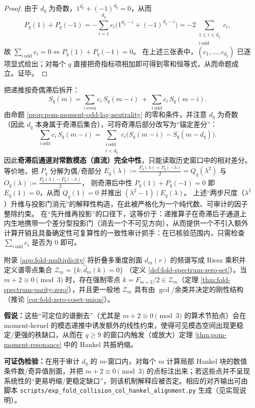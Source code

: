 \begin{proof}
由于 \(d_q\) 为奇数，\(1^{d_q}+(-1)^{d_q}=0\)，从而
\[
P_q(1)+P_q(-1)
= -\sum_{i=1}^{d_q} c_i\bigl(1^{d_q-i}+(-1)^{d_q-i}\bigr)
= -2\sum_{\substack{1\le i\le d_q\\ i\ \mathrm{odd}}}c_i,
\]
故 \(\sum_{i\ \mathrm{odd}}c_i=0\iff P_q(1)+P_q(-1)=0\)。
在上述三张表中，\((c_1,\dots,c_{d_q})\) 已逐项显式给出；对每个 \(q\) 直接把奇指标项相加即可得到零和恒等式，从而命题成立。证毕。
\end{proof}

\begin{remark}\label{rem:pom-moment-odd-lag-neutrality-gate}
把递推按奇偶滞后拆开：
\[
S_q(m)=\sum_{i\ \mathrm{even}}c_i\,S_q(m-i)\ +\ \sum_{i\ \mathrm{odd}}c_i\,S_q(m-i).
\]
由命题 \ref{prop:pom-moment-odd-lag-neutrality} 的零和条件，并注意 \(d_q\) 为奇数（因此 \(d_q\) 本身属于奇滞后集合），可将奇滞后部分改写为“锚定差分”：
\[
\sum_{i\ \mathrm{odd}}c_i\,S_q(m-i)
=\sum_{\substack{i\ \mathrm{odd}\\ i<d_q}}c_i\bigl(S_q(m-i)-S_q(m-d_q)\bigr).
\]
因此\textbf{奇滞后通道对常数模态（直流）完全中性}，只能读取历史窗口中的相对差分。
等价地，把 \(P_q\) 分解为偶/奇部分
\(
E_q(\lambda):=\frac{P_q(\lambda)+P_q(-\lambda)}{2}=Q_q(\lambda^2)
\)
与
\(
O_q(\lambda):=\frac{P_q(\lambda)-P_q(-\lambda)}{2}
\)，
则奇滞后中性 \(P_q(1)+P_q(-1)=0\) 即 \(E_q(1)=0\)，从而 \(Q_q(1)=0\) 并推出 \((\lambda^2-1)\mid E_q(\lambda)\)。
上述“两步尺度（\(\lambda^2\)）升维与投影门消元”的解释性构造，在此被严格化为一个纯代数、可审计的因子整除约束。
在“先升维再投影”的口径下，这等价于：递推算子在奇滞后子通道上内生地携带一个差分型投影门（消去一个不可见方向），从而提供一个不引入额外计算开销且具备确定性可复算性的一致性审计抓手：在已核验范围内，只需检查 \(\sum_{i\ \mathrm{odd}}c_i\) 是否为 \(0\) 即可。
\end{remark}

\begin{conjecture}\label{conj:pom-fourier-zero-driven-resonance}
附录 \ref{app:fold-multiplicity} 将折叠多重度剖面 \(d_m(r)\) 的频谱写成 Riesz 乘积并定义谱零点集合
\(
\mathcal{Z}_m=\{k:\widehat d_m(k)=0\}
\)
（定义 \ref{def:fold-spectrum-zero-set}）。当 \(m+2\equiv 0\pmod 3\) 时，存在强制零点 \(k=F_{m+2}/2\in\mathcal{Z}_m\)（定理 \ref{thm:fold-spectrum-parity-zero}），并且更一般地 \(\mathcal{Z}_m\) 具有由 \(\gcd\)/余类并决定的刚性结构（推论 \ref{cor:fold-zero-coset-union}）。
\par
\textbf{假说：}这些“可定位的谱删去”（尤其是 \(m+2\equiv 0\pmod 3\) 的算术节拍点）会在 moment-kernel 的模态递推中诱发额外的线性约束，使得可见模态空间出现更稳定/更强的秩缺口，从而在 \(q\ge 9\) 的窗口内触发（或放大）定理 \ref{thm:pom-moment-resonance} 中的 Hankel 共振坍缩。
\par
\textbf{可证伪检验：}在用于审计 \(d_q\) 的 \(m\)-窗口内，对每个 \(m\) 计算局部 Hankel 块的数值条件数/奇异值剖面，并把 \(m+2\equiv 0\pmod 3\) 的点标注出来；若这些点并不呈现系统性的“更易坍缩/更稳定缺口”，则该机制解释应被否定。相应的对齐输出可由脚本 \texttt{scripts/exp\_fold\_collision\_col\_hankel\_alignment.py} 生成（见实现说明）。
\end{conjecture}

